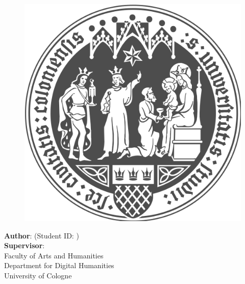 \makeatletter
\begin{titlepage}
    \begin{center}
        \vspace*{1cm}

        \Large
        \textbf{\@title}

        \vspace{1.5cm}
        
        \thesistype{}
        
        \vspace{1cm}

        \begin{figure}[htbp]
             \centering
             \includegraphics[width=.5\linewidth]{assets/uzk/UoC_Logo.png}
        \end{figure}

        \vspace{1cm}

        \large
        \textbf{Author}: \thesisauthor{} (Student ID: \studentID{})\\
        \large
        \textbf{Supervisor}: \supervisor{}\\

        \vspace{1cm}
        \large
        Faculty of Arts and Humanities\\
        Department for Digital Humanities\\
        University of Cologne\\

        \vspace{1cm}
        \@date

    \end{center}
\end{titlepage}
\makeatother